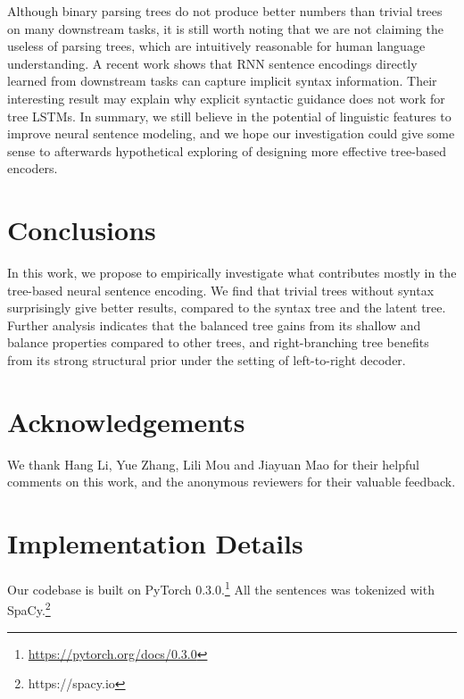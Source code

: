 \documentclass[11pt,a4paper]{article}
\begin{document}
Although binary parsing trees do not produce better numbers than trivial trees on many downstream tasks, it is still worth noting that we are not claiming the useless of parsing trees, which are intuitively reasonable for human language understanding. 
A recent work \cite{blevins2018deep} shows that RNN sentence encodings directly learned from downstream tasks can capture implicit syntax information.
Their interesting result may explain why explicit syntactic guidance does not work for tree LSTMs.
In summary, we still believe in the potential of linguistic features to improve neural sentence modeling, and we hope our investigation could give some sense to afterwards hypothetical exploring of designing  more effective tree-based encoders.


\section{Conclusions}
\label{sec:conclusions}
In this work, we propose to empirically investigate what contributes mostly in the tree-based neural sentence encoding. We find that trivial trees without syntax surprisingly give better results, compared to the syntax tree and the latent tree. Further analysis indicates that the balanced tree gains from its  shallow and balance properties compared to other trees, and right-branching tree benefits from its strong structural prior under the setting of left-to-right decoder. 


\section*{Acknowledgements}
We thank Hang Li, Yue Zhang, Lili Mou and \mbox{Jiayuan} Mao for their helpful comments on this work, and the anonymous reviewers for their valuable feedback. 

\newpage



\newpage
\appendix
\section{Implementation Details}
Our codebase is built on PyTorch 0.3.0.\footnote{\url{https://pytorch.org/docs/0.3.0}} All the sentences was tokenized with SpaCy.\footnote{https://spacy.io}
\end{document}
